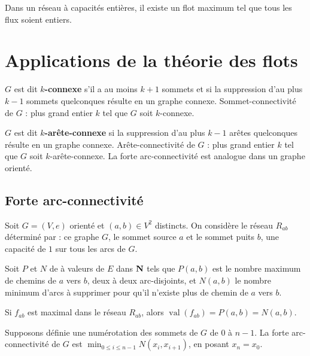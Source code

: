 \documentclass[a4paper,10pt,twocolumn]{article}
\DeclareMathOperator{\val}{val}
\begin{document}
	\begin{thm}
	Dans un réseau à capacités entières, il existe un flot maximum tel que tous les flux soient entiers.
	\end{thm}


\section{Applications de la théorie des flots}

	\begin{defn}
	$G$ est dit \textbf{$k$-connexe} s’il a au moins $k + 1$ sommets et si la suppression d’au plus $k - 1$ sommets quelconques résulte en un graphe connexe.
	Sommet-connectivité de $G$ : plus grand entier $k$ tel que $G$ soit $k$-connexe.
	\end{defn}

	\begin{defn}
	$G$ est dit \textbf{$k$-arête-connexe} si la suppression d’au plus $k - 1$ arêtes quelconques résulte en un graphe connexe.
	Arête-connectivité de $G$ : plus grand entier $k$ tel que $G$ soit $k$-arête-connexe.
	La forte arc-connectivité est analogue dans un graphe orienté.
	\end{defn}

	\subsection{Forte arc-connectivité}

		\begin{note}
		Soit $G = (V,e)$ orienté et $(a,b) \in V^2$ distincts.
		On considère le réseau $R_{ab}$ déterminé par : ce graphe $G$, le sommet source $a$ et le sommet puits $b$, une capacité de $1$ sur tous les arcs de $G$.
		\end{note}

		\begin{note}
		Soit $P$ et $N$ de à valeurs de $E$ dans $\mathbf{N}$ tels que $P(a,b)$ est le nombre maximum de chemins de $a$ vers $b$, deux à deux arc-disjoints, et $N(a,b)$ le nombre minimum d’arcs à supprimer pour qu’il n’existe plus de chemin de $a$ vers $b$.
		\end{note}

		\begin{thm}
		Si $f_{ab}$ est maximal dans le réseau $R_{ab}$, alors $\val(f_{ab}) = P(a,b) = N(a,b)$.
		\end{thm}

		\begin{lem}[Zorn]
		Supposons définie une numérotation des sommets de $G$ de $0$ à $n - 1$.
		La forte arc-connectivité de $G$ est $\min_{0 \leq i \leq n-1} N(x_i,x_{i+1})$, en posant $x_n = x_0$.
		\end{lem}
\end{document}
